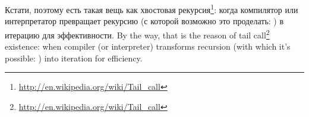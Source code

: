 \newcommand{\URLT}{\url{http://en.wikipedia.org/wiki/Tail_call}}
\IFRU
{Кстати, поэтому есть такая вещь как хвостовая рекурсия\footnote{\URLT}: 
когда компилятор или интерпретатор превращает рекурсию (с которой возможно это проделать: 
) в итерацию для эффективности.}
{By the way, that is the reason of tail call\footnote{\URLT} existence: when compiler (or interpreter) 
transforms recursion (with which it's possible: ) into iteration for efficiency.}
